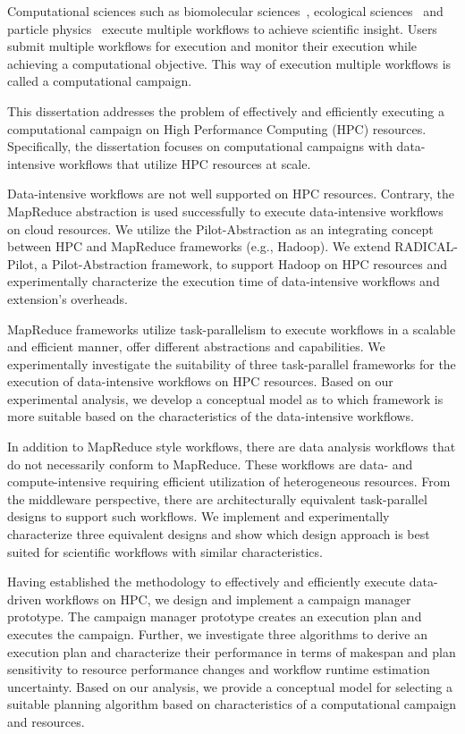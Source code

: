 Computational sciences such as biomolecular sciences~\cite{cheatham2015impact,
dakka2018concurrent}, ecological sciences~\cite{goncalves2020sealnet,
paraskevakos2019workflow} and particle physics~\cite{atlas} execute multiple
workflows to achieve scientific insight. Users submit multiple workflows for
execution and monitor their execution while achieving a computational objective.
This way of execution multiple workflows is called a computational campaign.

This dissertation addresses the problem of effectively and efficiently executing
a computational campaign on High Performance Computing (HPC) resources.
Specifically, the dissertation focuses on computational campaigns with
data-intensive workflows that utilize HPC resources at scale.

Data-intensive workflows are not well supported on HPC resources. Contrary, the
MapReduce abstraction is used successfully to execute data-intensive workflows
on cloud resources. We utilize the Pilot-Abstraction as an integrating concept
between HPC and MapReduce frameworks (e.g., Hadoop). We extend RADICAL-Pilot, a
Pilot-Abstraction framework, to support Hadoop on HPC resources and
experimentally characterize the execution time of data-intensive workflows and
extension's overheads.

MapReduce frameworks utilize task-parallelism to execute workflows in a
scalable and efficient manner, offer different abstractions and capabilities.
We experimentally investigate the suitability of three task-parallel
frameworks for the execution of data-intensive workflows on HPC resources.
Based on our experimental analysis, we develop a conceptual model as to which
framework is more suitable based on the characteristics of the data-intensive
workflows.

In addition to MapReduce style workflows, there are data analysis workflows
that do not necessarily conform to MapReduce. These workflows are data-
and compute-intensive requiring efficient utilization of heterogeneous 
resources. From the middleware perspective, there are architecturally 
equivalent task-parallel designs to support such workflows. We implement and  
experimentally characterize three equivalent designs and show which design 
approach is best suited for scientific workflows with similar characteristics.

Having established the methodology to effectively and efficiently execute
data-driven workflows on HPC, we design and implement a campaign manager
prototype. The campaign manager prototype creates an execution plan and
executes the campaign. Further, we investigate three algorithms to derive an
execution plan and characterize their performance in terms of makespan and
plan sensitivity to resource performance changes and workflow runtime
estimation uncertainty. Based on our analysis, we provide a conceptual model
for selecting a suitable planning algorithm based on characteristics of a
computational campaign and resources.

